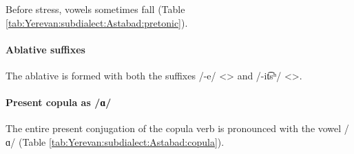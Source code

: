 Before stress, vowels sometimes fall (Table \ref{tab:Yerevan:subdialect:Astabad:pretonic}).%


\begin{table}[H]
	\centering
	\caption{Pre-tonic deletion of vowels in the Astabad subdialect of the Yerevan dialect}
	\label{tab:Yerevan:subdialect:Astabad:pretonic}
	
\end{table}

 

\paragraph{Ablative suffixes}

The ablative is formed with both the suffixes /-e/ <> and /-it͡sʰ/ <>. 

\paragraph{Present copula as /ɑ/}

The entire present conjugation of the copula verb is pronounced with the vowel /ɑ/ (Table \ref{tab:Yerevan:subdialect:Astabad:copula}). 


